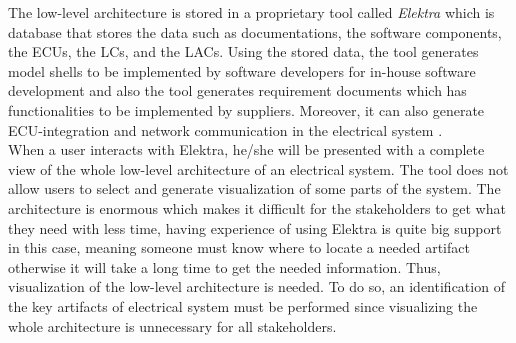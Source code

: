 The low-level architecture is stored in a proprietary tool called \textit{Elektra} which is database that stores the data such as documentations, the software components, the ECUs, the LCs, and the LACs. Using the stored data, the tool generates model shells to be implemented by software developers for in-house software development and also the tool generates requirement documents which has functionalities to be implemented by suppliers. Moreover, it can also generate ECU-integration and network communication in the electrical system \cite{Eliasson_2}.\\

When a user interacts with Elektra, he/she will be presented with a complete view of the whole low-level architecture of an electrical system. The tool does not allow users to select and generate visualization of some parts of the system. The architecture is enormous which makes it difficult for the stakeholders to get what they need with less time, having experience of using Elektra is quite big support in this case, meaning someone must know where to locate a needed artifact otherwise it will take a long time to get the needed information. Thus, visualization of the low-level architecture is needed. To do so, an identification of the key artifacts of electrical system must be performed since visualizing the whole architecture is unnecessary for all stakeholders. \\

